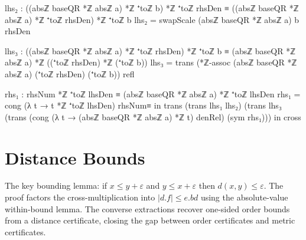 \documentclass[11pt,a4paper]{book}
\def\cdot{.}%
\begin{document}
\begin{code}
        lhs₂ : ((absℤ baseQR *ℤ absℤ a) *ℤ ⁺toℤ b) *ℤ ⁺toℤ rhsDen ≡ ((absℤ baseQR *ℤ absℤ a) *ℤ ⁺toℤ rhsDen) *ℤ ⁺toℤ b
        lhs₂ = swapScale (absℤ baseQR *ℤ absℤ a) b rhsDen

        lhs₃ : ((absℤ baseQR *ℤ absℤ a) *ℤ ⁺toℤ rhsDen) *ℤ ⁺toℤ b ≡ (absℤ baseQR *ℤ absℤ a) *ℤ ((⁺toℤ rhsDen) *ℤ (⁺toℤ b))
        lhs₃ = trans (*ℤ-assoc (absℤ baseQR *ℤ absℤ a) (⁺toℤ rhsDen) (⁺toℤ b)) refl

        rhs₁ : rhsNum *ℤ ⁺toℤ lhsDen ≡ (absℤ baseQR *ℤ absℤ a) *ℤ ⁺toℤ lhsDen
        rhs₁ = cong (λ t → t *ℤ ⁺toℤ lhsDen) rhsNum≡
      in
      trans
        (trans lhs₁ lhs₂)
        (trans
          lhs₃
          (trans
            (cong (λ t → (absℤ baseQR *ℤ absℤ a) *ℤ t) denRel)
            (sym rhs₁)))
  in
  cross
\end{code}

\section{Distance Bounds}

The key bounding lemma: if $x \le y + \varepsilon$ and $y \le x + \varepsilon$
then $d(x,y) \le \varepsilon$. The proof factors the cross-multiplication
into $|d \cdot f| \le e \cdot bd$ using the absolute-value within-bound
lemma. The converse extractions recover one-sided order bounds from
a distance certificate, closing the gap between order
certificates and metric certificates.
\end{document}
